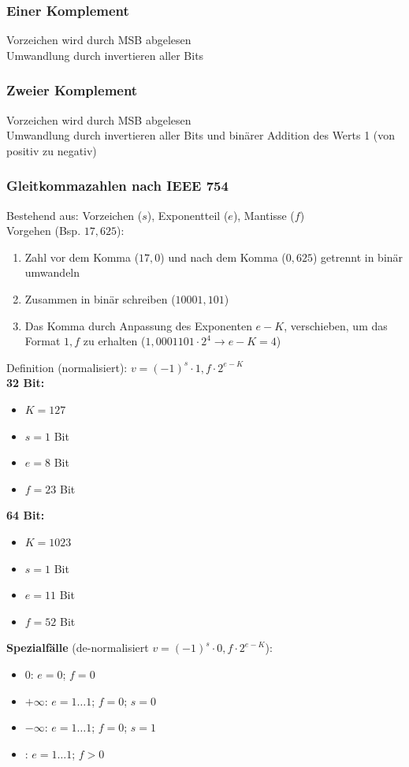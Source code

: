 \documentclass[german, threecolumn, 8pt]{latex4ei/latex4ei_sheet}
\begin{document}
	\subsubsection{Einer Komplement}
	Vorzeichen wird durch MSB abgelesen\\
	Umwandlung durch invertieren aller Bits
	\subsubsection{Zweier Komplement}
	Vorzeichen wird durch MSB abgelesen\\
	Umwandlung durch invertieren aller Bits und binärer Addition des Werts 1 (von positiv zu negativ)


	\subsubsection{Gleitkommazahlen nach IEEE 754}
	Bestehend aus: Vorzeichen ($s$), Exponentteil ($e$), Mantisse ($f$)\\
	Vorgehen (Bsp. $17,625$): 
	\begin{enumerate}
	\item Zahl vor dem Komma ($17,0$) und nach dem Komma ($0,625$) getrennt in binär umwandeln
	\item Zusammen in binär schreiben ($10001,101$)
	\item Das Komma durch Anpassung des Exponenten $e-K$, verschieben, um das Format $1,f$ zu erhalten ($1,0001101 \cdot 2^4 \rightarrow e-K=4$) \\
	\end{enumerate}
\begin{sectionbox}
	Definition (normalisiert): $v=(-1)^s \cdot 1,f \cdot 2^{e-K}$\\
    \textbf{32 Bit:}
        \begin{itemize}\itemsep0pt
            \item $K=127$
            \item $s = 1$ Bit
            \item $e = 8$ Bit
            \item $f = 23$ Bit
        \end{itemize}
    \textbf{64 Bit:}
        \begin{itemize}\itemsep0pt
            \item $K=1023$
            \item $s = 1$ Bit
            \item $e = 11$ Bit
            \item $f = 52$ Bit
        \end{itemize}
	\textbf{Spezialfälle} (de-normalisiert $v=(-1)^s \cdot 0,f \cdot 2^{e-K}$):
	\begin{itemize}\itemsep0pt
	\item 0: $e=0$; $f=0$
	\item $+\infty$: $e=1\dots1$; $f=0$; $s=0$
	\item $-\infty$: $e=1\dots1$; $f=0$; $s=1$
	\item {}: $e=1\dots1$; $f>0$
	\end{itemize}
\end{sectionbox}
\end{document}
